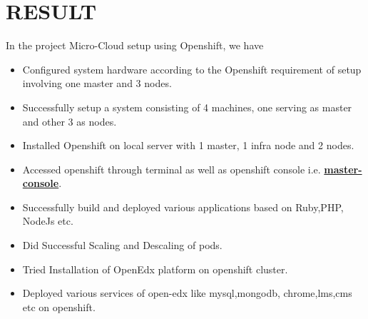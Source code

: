 \documentclass[11pt]{report}
\begin{document}
	\section{RESULT}
	\large
	In the project Micro-Cloud setup using Openshift, we have
	\begin{itemize}
		\vspace{0.3cm}    
		\item Configured system hardware according to the Openshift requirement of setup involving one master and 3 nodes.
		\vspace{0.3cm}    
		\item Successfully setup a system consisting of 4 machines, one serving as master and other 3 as nodes.
		\vspace{0.3cm}
		\item Installed Openshift on local server with 1 master, 1 infra node and 2 nodes.
		\vspace{0.3cm}
		\item Accessed openshift through terminal as well as openshift console i.e.
		\textbf{ \href{https://master.cse.iitb.ac.in:8443}{master-console}}.
		\vspace{0.3cm}
		\item Successfully build and deployed various applications based on Ruby,PHP, NodeJs etc.
		\vspace{0.3cm}
		\item Did Successful Scaling and Descaling of pods.
		\vspace{0.3cm}
		\item Tried Installation of OpenEdx platform on openshift cluster.
		\vspace{0.3cm}
		\item Deployed various services of open-edx like mysql,mongodb,
		chrome,lms,cms etc on openshift.
		\large
	\end{itemize}
	\vspace{0.6cm}
	\pagebreak
	\Large
\end{document}

